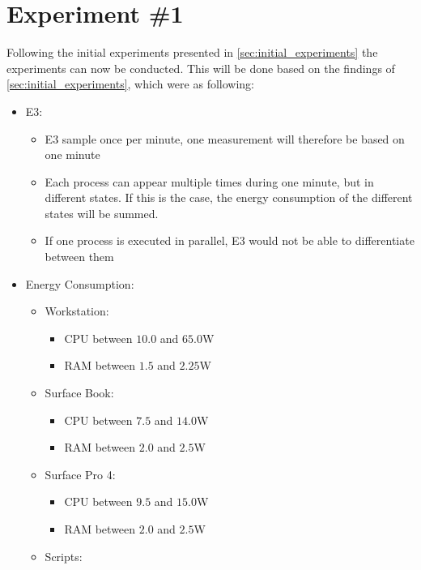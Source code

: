 \section{Experiment \#1}\label{sec:experiment_one}

Following the initial experiments presented in \cref{sec:initial_experiments} the experiments can now be conducted. This will be done based on the findings of \cref{sec:initial_experiments}, which were as following:

\begin{itemize}
    \item E3:
    \begin{itemize}
        \item E3 sample once per minute, one measurement will therefore be based on one minute
        \item Each process can appear multiple times during one minute, but in different states. If this is the case, the energy consumption of the different states will be summed.
        \item If one process is executed in parallel, E3 would not be able to differentiate between them
    \end{itemize}
    \item Energy Consumption:
    \begin{itemize}
        \item Workstation: 
        \begin{itemize}
            \item CPU between $10.0$ and $65.0$W
            \item RAM between $1.5$ and $2.25$W
        \end{itemize}
        \item Surface Book: 
        \begin{itemize}
            \item CPU between $7.5$ and $14.0$W
            \item RAM between $2.0$ and $2.5$W
        \end{itemize}
        \item Surface Pro 4: 
        \begin{itemize}
            \item CPU between $9.5$ and $15.0$W
            \item RAM between $2.0$ and $2.5$W
        \end{itemize}
        \item Scripts:
        \begin{itemize}

\end{itemize}
\end{itemize}
\end{itemize}
